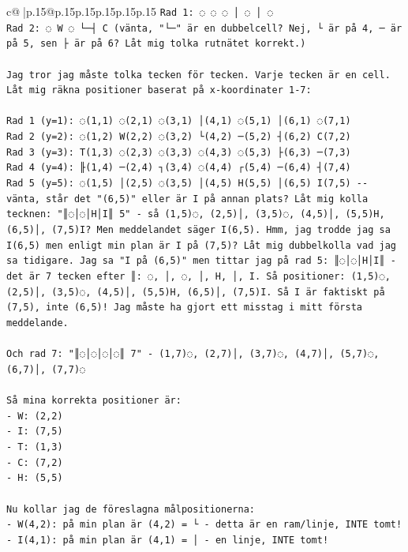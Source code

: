 \documentclass{article}
\begin{document}
{\begin{supertabular}{c@{$\;$}|p{.15\linewidth}@{}p{.15\linewidth}p{.15\linewidth}p{.15\linewidth}p{.15\linewidth}p{.15\linewidth}}
{{{\texttt{Rad 1: ◌ ◌ ◌ │ ◌ │ ◌} \\
\texttt{Rad 2: ◌ W ◌ └─┤ C  (vänta, "└─" är en dubbelcell? Nej, └ är på 4, ─ är på 5, sen ├ är på 6? Låt mig tolka rutnätet korrekt.)} \\
\\ 
\texttt{Jag tror jag måste tolka tecken för tecken. Varje tecken är en cell. Låt mig räkna positioner baserat på x{-}koordinater 1{-}7:} \\
\\ 
\texttt{Rad 1 (y=1): ◌(1,1) ◌(2,1) ◌(3,1) │(4,1) ◌(5,1) │(6,1) ◌(7,1)} \\
\texttt{Rad 2 (y=2): ◌(1,2) W(2,2) ◌(3,2) └(4,2) ─(5,2) ┤(6,2) C(7,2)} \\
\texttt{Rad 3 (y=3): T(1,3) ◌(2,3) ◌(3,3) ◌(4,3) ◌(5,3) ├(6,3) ─(7,3)} \\
\texttt{Rad 4 (y=4): ╟(1,4) ─(2,4) ┐(3,4) ◌(4,4) ┌(5,4) ─(6,4) ┤(7,4)} \\
\texttt{Rad 5 (y=5): ◌(1,5) │(2,5) ◌(3,5) │(4,5) H(5,5) │(6,5) I(7,5)  {-}{-} vänta, står det "(6,5)" eller är I på annan plats? Låt mig kolla tecknen: "║◌│◌│H│I║ 5" {-} så (1,5)◌, (2,5)│, (3,5)◌, (4,5)│, (5,5)H, (6,5)│, (7,5)I? Men meddelandet säger I(6,5). Hmm, jag trodde jag sa I(6,5) men enligt min plan är I på (7,5)? Låt mig dubbelkolla vad jag sa tidigare. Jag sa "I på (6,5)" men tittar jag på rad 5: ║◌│◌│H│I║ {-} det är 7 tecken efter ║: ◌, │, ◌, │, H, │, I. Så positioner: (1,5)◌, (2,5)│, (3,5)◌, (4,5)│, (5,5)H, (6,5)│, (7,5)I. Så I är faktiskt på (7,5), inte (6,5)! Jag måste ha gjort ett misstag i mitt första meddelande.} \\
\\ 
\texttt{Och rad 7: "║◌│◌│◌│◌║ 7" {-} (1,7)◌, (2,7)│, (3,7)◌, (4,7)│, (5,7)◌, (6,7)│, (7,7)◌} \\
\\ 
\texttt{Så mina korrekta positioner är:} \\
\texttt{{-} W: (2,2)} \\
\texttt{{-} I: (7,5)} \\
\texttt{{-} T: (1,3)} \\
\texttt{{-} C: (7,2)} \\
\texttt{{-} H: (5,5)} \\
\\ 
\texttt{Nu kollar jag de föreslagna målpositionerna:} \\
\texttt{{-} W(4,2): på min plan är (4,2) = └ {-} detta är en ram/linje, INTE tomt!} \\
\texttt{{-} I(4,1): på min plan är (4,1) = │ {-} en linje, INTE tomt!} \\
}}}
\end{supertabular}}
\end{document}
